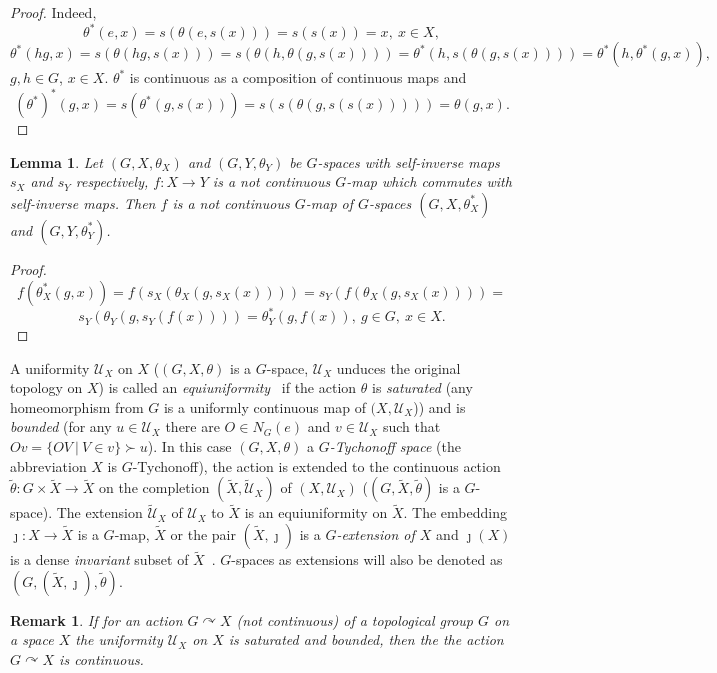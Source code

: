 \documentclass{amsart}
\newtheorem{lem}[thm]{Lemma}
\newtheorem{rem}[thm]{Remark}
\begin{document}
\begin{proof}
Indeed, 
$$\theta^* (e, x)=s(\theta (e, s(x)))=s(s(x))=x,\  x\in X,$$
$$\theta^* (hg, x)=s(\theta (hg, s(x)))=s(\theta (h, \theta (g, s(x))))=\theta^*(h, s(\theta (g, s(x))))=\theta^*(h, \theta^*(g, x)),$$
$g, h\in G$, $x\in X$. $\theta^*$ is continuous as a composition of continuous maps and 
$$(\theta^*)^*(g, x)=s(\theta^* (g, s(x)))=s(s(\theta (g, s(s(x)))))=\theta (g, x).$$
\end{proof}

\begin{lem}\label{ginversg}
Let $(G, X, \theta_X)$ and  $(G, Y, \theta_Y)$ be $G$-spaces with self-inverse maps $s_X$ and $s_Y$ respectively, $f: X\to Y$ is a not continuous $G$-map which commutes with self-inverse maps. Then $f$ is a not continuous $G$-map of $G$-spaces $(G, X, \theta^*_X)$ and $(G, Y, \theta^*_Y)$.
\end{lem}

\begin{proof}
$$f(\theta^*_X(g, x))=f(s_X(\theta_X (g, s_X(x))))=s_Y(f(\theta_X (g, s_X(x))))=$$
$$s_Y(\theta_Y (g, s_Y(f(x))))=\theta^*_Y(g, f(x)),\ g\in G,\ x\in X.$$
\end{proof}

A uniformity $\mathcal U_X$ on $X$ ($(G, X, \theta)$ is a $G$-space, $\mathcal U_X$ unduces the original topology on $X$) is called an {\it equiuniformity}~\cite{Megr1984} if the action $\theta$ is {\it saturated} (any homeomorphism from $G$ is a uniformly continuous map of $(X, \mathcal U_X$)) and is {\it bounded} (for any $u\in\mathcal U_X$ there are $O\in N_G(e)$ and $v\in\mathcal U_X$ such that $Ov=\{OV\ |\ V\in v\}\succ u$). In this case $(G, X, \theta)$ a {\it $G$-Tychonoff space} (the abbreviation $X$ is $G$-Tychonoff), the action is extended to the continuous action  $\tilde\theta: G\times \tilde X\to\tilde X$ on the completion $(\tilde X, \tilde{\mathcal U}_X)$ of $(X, \mathcal U_X)$ ($(G, \tilde X, \tilde\theta)$ is a $G$-space). The extension $\tilde{\mathcal U}_X$ of $\mathcal U_X$ to $\tilde X$ is an equiuniformity on $\tilde X$. The embedding $\jmath: X\to\tilde X$ is a $G$-map, $\tilde X$ or the pair $(\tilde X, \jmath)$  is a {\it $G$-extension of $X$} and $\jmath (X)$ is a dense {\it invariant} subset of $\tilde X$~\cite{Megr0}. $G$-spaces as extensions will also be denoted as $(G, (\tilde X, \jmath), \tilde\theta)$.

\begin{rem}\label{contact}
 {\rm If  for an action $G\curvearrowright X$ (not continuous) of a topological group $G$ on a space $X$ the uniformity $\mathcal U_X$ on $X$ is saturated and  bounded, then the the action $G\curvearrowright X$ is continuous.}
\end{rem}
\end{document}
